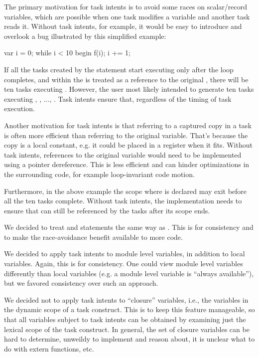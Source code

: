 \begin{rationale}
The primary motivation for task intents is to avoid some races on
scalar/record variables, which are possible when one task modifies a
variable and another task reads it. Without task intents,
for example, it would be easy to introduce and overlook a bug
illustrated by this simplified example:

  \begin{chapel}
  {
    var i = 0;
    while i < 10 {
      begin {
        f(i);
      }
      i += 1;
    }
  }
  \end{chapel}

If all the tasks created by the  statement start executing
only after the  loop completes, and  within the
 is treated as a reference to the original ,
there will be ten tasks executing . However, the user most
likely intended to generate ten tasks executing
, , ..., .
Task intents ensure that, regardless of the timing of task execution.

Another motivation for task intents is that referring to a captured
copy in a task is often more efficient than referring to the original
variable. That's because the copy is a local constant, e.g. it could
be placed in a register when it fits.  Without task intents,
references to the original variable would need to be implemented using
a pointer dereference. This is less efficient and can hinder optimizations
in the surrounding code, for example loop-invariant code motion.

Furthermore, in the above example the scope where  is declared
may exit before all the ten tasks complete.  Without task intents,
the implementation needs to ensure that  can still be
referenced by the tasks after its scope ends.

We decided to treat  and  statements the
same way as . This is for consistency and to make the
race-avoidance benefit available to more code.

We decided to apply task intents to module level variables, in addition
to local variables. Again, this is for consistency. One could view module
level variables differently than local variables (e.g. a module level 
variable is ``always available''), but we favored consistency over such
an approach.

We decided not to apply task intents to ``closure'' variables, i.e.,
the variables in the dynamic scope of a task construct. This is to
keep this feature manageable, so that all variables subject to task
intents can be obtained by examining just the lexical scope of the
task construct. In general, the set of closure variables can be hard
to determine, unweildy to implement and reason about, it is unclear
what to do with extern functions, etc.
\end{rationale}


